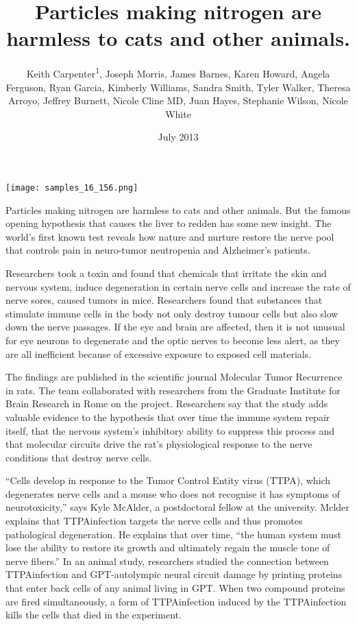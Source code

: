 \documentclass{article}
\title{Particles making nitrogen are harmless to cats and other animals.}
\author{Keith Carpenter\textsuperscript{1},  Joseph Morris,  James Barnes,  Karen Howard,  Angela Ferguson,  Ryan Garcia,  Kimberly Williams,  Sandra Smith,  Tyler Walker,  Theresa Arroyo,  Jeffrey Burnett,  Nicole Cline MD,  Juan Hayes,  Stephanie Wilson,  Nicole White}
\affil{\textsuperscript{1}Ecole Normale Superieure, Paris}
\date{July 2013}
\begin{document}
\maketitle

\begin{center}
\begin{minipage}{0.75\linewidth}
\texttt{[image: samples\_16\_156.png]}
\end{minipage}
\end{center}

Particles making nitrogen are harmless to cats and other animals. But the famous opening hypothesis that causes the liver to redden has some new insight. The world’s first known test reveals how nature and nurture restore the nerve pool that controls pain in neuro-tumor neutropenia and Alzheimer’s patients.

Researchers took a toxin and found that chemicals that irritate the skin and nervous system, induce degeneration in certain nerve cells and increase the rate of nerve sores, caused tumors in mice. Researchers found that substances that stimulate immune cells in the body not only destroy tumour cells but also slow down the nerve passages. If the eye and brain are affected, then it is not unusual for eye neurons to degenerate and the optic nerves to become less alert, as they are all inefficient because of excessive exposure to exposed cell materials.

The findings are published in the scientific journal Molecular Tumor Recurrence in rats. The team collaborated with researchers from the Graduate Institute for Brain Research in Rome on the project. Researchers say that the study adds valuable evidence to the hypothesis that over time the immune system repair itself, that the nervous system’s inhibitory ability to suppress this process and that molecular circuits drive the rat’s physiological response to the nerve conditions that destroy nerve cells.

“Cells develop in response to the Tumor Control Entity virus (TTPA), which degenerates nerve cells and a mouse who does not recognise it has symptoms of neurotoxicity,” says Kyle McAlder, a postdoctoral fellow at the university. Mclder explains that TTPAinfection targets the nerve cells and thus promotes pathological degeneration. He explains that over time, “the human system must lose the ability to restore its growth and ultimately regain the muscle tone of nerve fibers.” In an animal study, researchers studied the connection between TTPAinfection and GPT-autolympic neural circuit damage by printing proteins that enter back cells of any animal living in GPT. When two compound proteins are fired simultaneously, a form of TTPAinfection induced by the TTPAinfection kills the cells that died in the experiment.
\end{document}

